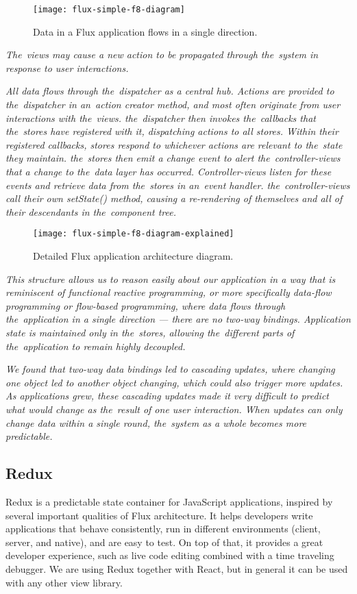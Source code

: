\begin{figure}[ht!]
\centering
\texttt{[image: flux-simple-f8-diagram]}
\caption{Data in a Flux application flows in a single direction. \citep{flux}}
\label{r:42}
\end{figure}

\textsl{The~views may cause a new action to be propagated through the~system in response to user interactions.} \citep{flux}

\textsl{All data flows through the~dispatcher as a central hub. Actions are provided to the~dispatcher in an~action creator method, and most often originate from user interactions with the~views. the~dispatcher then invokes the~callbacks that the~stores have registered with it, dispatching actions to all stores. Within their registered callbacks, stores respond to whichever actions are relevant to the~state they maintain. the~stores then emit a change event to alert the~controller-views that a change to the~data layer has occurred. Controller-views listen for these events and retrieve data from the~stores in an~event handler. the~controller-views call their own setState() method, causing a re-rendering of themselves and all of their descendants in the~component tree.} \citep{flux}

\begin{figure}[ht!]
\centering
\texttt{[image: flux-simple-f8-diagram-explained]}
\caption{Detailed Flux application architecture diagram. \citep{flux}}
\label{r:43}
\end{figure}

\textsl{This structure allows us to reason easily about our application in a way that is reminiscent of functional reactive programming, or more specifically data-flow programming or flow-based programming, where data flows through the~application in a single direction — there are no two-way bindings. Application state is maintained only in the~stores, allowing the~different parts of the~application to remain highly decoupled.} \citep{flux}

\textsl{We found that two-way data bindings led to cascading updates, where changing one object led to another object changing, which could also trigger more updates. As applications grew, these cascading updates made it very difficult to predict what would change as the~result of one user interaction. When updates can only change data within a single round, the~system as a whole becomes more predictable.} \citep{flux}

\subsection{Redux}
Redux is a predictable state container for JavaScript applications, inspired by several important qualities of Flux architecture. It helps developers write applications that behave consistently, run in different environments (client, server, and native), and are easy to test. On top of that, it provides a great developer experience, such as live code editing combined with a time traveling debugger.\citep{redux-intro} We are using Redux together with React, but in general it can be used with any other view library.

